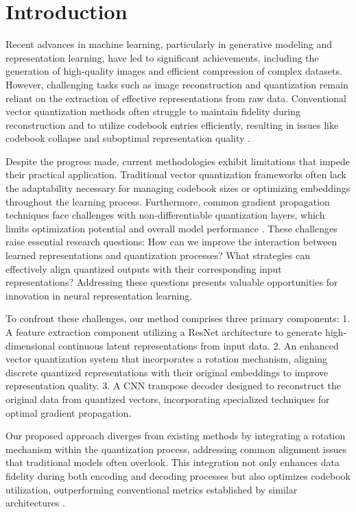 \section{Introduction}

Recent advances in machine learning, particularly in generative modeling and representation learning, have led to significant achievements, including the generation of high-quality images and efficient compression of complex datasets. However, challenging tasks such as image reconstruction and quantization remain reliant on the extraction of effective representations from raw data. Conventional vector quantization methods often struggle to maintain fidelity during reconstruction and to utilize codebook entries efficiently, resulting in issues like codebook collapse and suboptimal representation quality \cite{vqvae, codebookcollapse}.

Despite the progress made, current methodologies exhibit limitations that impede their practical application. Traditional vector quantization frameworks often lack the adaptability necessary for managing codebook sizes or optimizing embeddings throughout the learning process. Furthermore, common gradient propagation techniques face challenges with non-differentiable quantization layers, which limits optimization potential and overall model performance \cite{straightthrough, quantizationaware}. These challenges raise essential research questions: How can we improve the interaction between learned representations and quantization processes? What strategies can effectively align quantized outputs with their corresponding input representations? Addressing these questions presents valuable opportunities for innovation in neural representation learning.

To confront these challenges, our method comprises three primary components:
1. A feature extraction component utilizing a ResNet architecture to generate high-dimensional continuous latent representations from input data.
2. An enhanced vector quantization system that incorporates a rotation mechanism, aligning discrete quantized representations with their original embeddings to improve representation quality.
3. A CNN transpose decoder designed to reconstruct the original data from quantized vectors, incorporating specialized techniques for optimal gradient propagation.

Our proposed approach diverges from existing methods by integrating a rotation mechanism within the quantization process, addressing common alignment issues that traditional models often overlook. This integration not only enhances data fidelity during both encoding and decoding processes but also optimizes codebook utilization, outperforming conventional metrics established by similar architectures \cite{vqgan, dall_e}.


